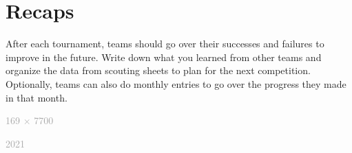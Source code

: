 \documentclass[letterpaper, 12pt]{article}
\begin{document}
\section*{Recaps}

After each tournament, teams should go over their successes and failures to improve in the future. Write down what you learned from other teams and organize the data from scouting sheets to plan for the next competition. Optionally, teams can also do monthly entries to go over the progress they made in that month.

\vspace{1.3in}

\begin{center}
\textcolor{darkgray}{169 $\times$ 7700}

\vspace{0.1in}

\textcolor{darkgray}{2021}
\end{center}
\end{document}
